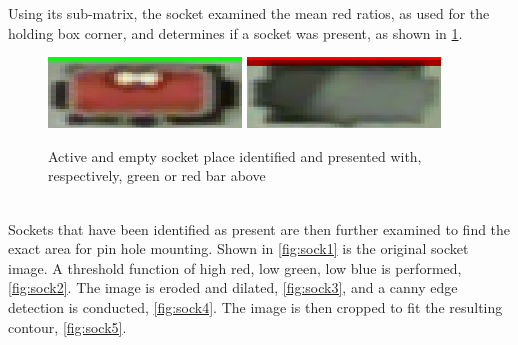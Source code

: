 \documentclass[11pt,a4paper]{report}
\begin{document}
Using its sub-matrix, the socket examined the mean red ratios, as used for the holding box corner, and determines if a socket was present, as shown in \cref{fig:fullSock}.
\begin{figure}[h]
\centering
\includegraphics[width=0.4\linewidth]{fullSock} %
\includegraphics[width=0.4\linewidth]{emptySock}
\caption{Active and empty socket place identified and presented with, respectively, green or red bar above}
\label{fig:fullSock}
\end{figure}\\

Sockets that have been identified as present are then further examined to find the exact area for pin hole mounting. Shown in \cref{fig:sock1} is the original socket image. A threshold function of high red, low green, low blue is performed, \cref{fig:sock2}. The image is eroded and dilated, \cref{fig:sock3}, and a canny edge detection is conducted, \cref{fig:sock4}. The image is then cropped to fit the resulting contour, \cref{fig:sock5}.\\
\end{document}
